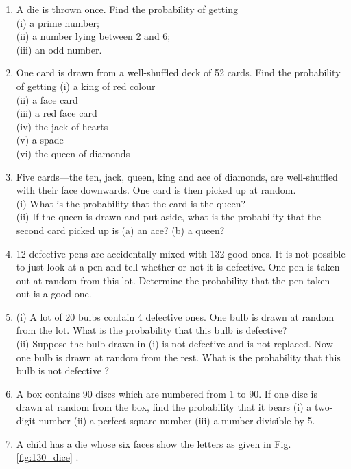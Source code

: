 \begin{enumerate}[label=\arabic*.,ref=\thesubsection.\theenumi]
\begin{figure}[!ht]
\end{figure}
\\
\solution

\item A die is thrown once. Find the probability of getting\\
(i) a prime number;\\
(ii) a number lying between 2 and 6;\\
(iii) an odd number.
\\
\solution

\item One card is drawn from a well-shuffled deck of 52 cards. Find the probability of getting
(i) a king of red colour\\
(ii) a face card\\
(iii) a red face card\\
(iv) the jack of hearts \\
(v) a spade \\
(vi) the queen of diamonds
\\
\solution

\item Five cards—the ten, jack, queen, king and ace of diamonds, are well-shuffled with their
face downwards. One card is then picked up at random.\\
(i) What is the probability that the card is the queen?\\
(ii) If the queen is drawn and put aside, what is the probability that the second card
picked up is (a) an ace? (b) a queen?
\\
\solution

\item 12 defective pens are accidentally mixed with 132 good ones. It is not possible to just
look at a pen and tell whether or not it is defective. One pen is taken out at random from
this lot. Determine the probability that the pen taken out is a good one.
\\
\solution

\item (i) A lot of 20 bulbs contain 4 defective ones. One bulb is drawn at random from the lot.
What is the probability that this bulb is defective?\\
(ii) Suppose the bulb drawn in (i) is not defective and is not replaced. Now one bulb
is drawn at random from the rest. What is the probability that this bulb is not
defective ?
\\
\solution

\item A box contains 90 discs which are numbered from 1 to 90. If one disc is drawn at random
from the box, find the probability that it bears (i) a two-digit number (ii) a perfect
square number (iii) a number divisible by 5.
\\
\solution

\item A child has a die whose six faces show the letters as given in Fig. \ref{fig:130_dice}	.


\end{enumerate}
